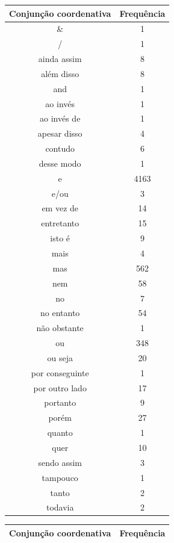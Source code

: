 \documentclass[output=paper,colorlinks,citecolor=brown]{langscibook}
\begin{document}
	\begin{table}[]
		\parbox{.45\linewidth}{
			\centering
			\begin{tabular}{|c|c|}
				\hline
				\textbf{Conjunção coordenativa} & \textbf{Frequência} \\\hline
				\& & 1\\\hline
				/ & 1\\\hline
				ainda assim & 8\\\hline
				além disso & 8\\\hline
				and & 1\\\hline
				ao invés & 1\\\hline
				ao invés de & 1\\\hline
				apesar disso & 4\\\hline
				contudo & 6\\\hline
				desse modo & 1\\\hline
				e & 4163\\\hline
				e/ou & 3\\\hline
				em vez de & 14\\\hline
				entretanto & 15\\\hline
				isto é & 9\\\hline
				mais & 4\\\hline
				mas & 562\\\hline
				nem & 58\\\hline
				no & 7\\\hline
				no entanto & 54\\\hline
				não obstante & 1\\\hline
				ou & 348\\\hline
				ou seja & 20\\\hline
				por conseguinte & 1\\\hline
				por outro lado & 17\\\hline
				portanto & 9\\\hline
				porém & 27\\\hline
				quanto & 1\\\hline
				quer & 10\\\hline
				sendo assim & 3\\\hline
				tampouco & 1\\\hline
				tanto & 2\\\hline
				todavia & 2\\\hline
			\end{tabular}
		}
		\hfill
		\parbox{.45\linewidth}{
			\centering
			\begin{tabular}{|c|c|}
				\hline
				\textbf{Conjunção coordenativa} & \textbf{Frequência} \\\hline

\end{tabular}}
\end{table}
\end{document}
